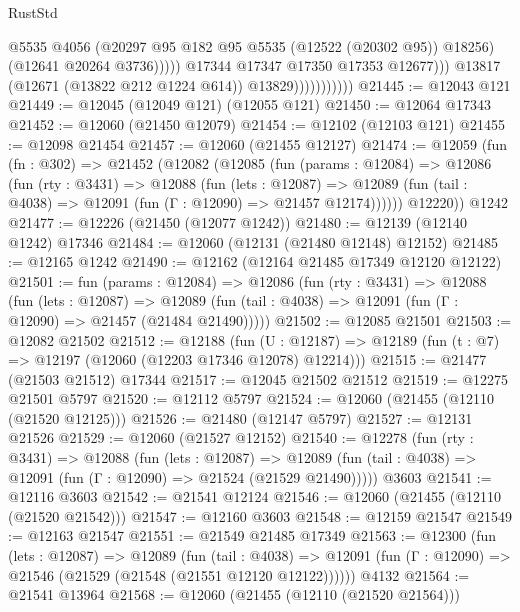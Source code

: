 \begin{lexlean}{RustStd}
\begin{coremodule}
                                        @5535
                                        @4056
                                        (@20297 @95 @182 @95 @5535 (@12522 (@20302 @95)) @18256)
                                        (@12641 @20264 @3736)))))
                                @17344
                                @17347
                                @17350
                                @17353
                                @12677)))
                          @13817
                          (@12671 (@13822 @212 @1224 @614))
                          @13829)))))))))))
@21445 := @12043 @121
@21449 := @12045 (@12049 @121) (@12055 @121)
@21450 := @12064 @17343
@21452 := @12060 (@21450 @12079)
@21454 := @12102 (@12103 @121)
@21455 := @12098 @21454
@21457 := @12060 (@21455 @12127)
@21474 := @12059
    (fun (fn : @302) =>
    @21452
      (@12082
        (@12085
          (fun (params : @12084) =>
          @12086
            (fun (rty : @3431) =>
            @12088
              (fun (lets : @12087) =>
              @12089 (fun (tail : @4038) => @12091 (fun (Γ : @12090) => @21457 @12174))))))
        @12220))
    @1242
@21477 := @12226 (@21450 (@12077 @1242))
@21480 := @12139 (@12140 @1242) @17346
@21484 := @12060 (@12131 (@21480 @12148) @12152)
@21485 := @12165 @1242
@21490 := @12162 (@12164 @21485 @17349 @12120 @12122)
@21501 := fun (params : @12084) =>
  @12086
    (fun (rty : @3431) =>
    @12088
      (fun (lets : @12087) =>
      @12089 (fun (tail : @4038) => @12091 (fun (Γ : @12090) => @21457 (@21484 @21490)))))
@21502 := @12085 @21501
@21503 := @12082 @21502
@21512 := @12188
    (fun (U : @12187) => @12189 (fun (t : @7) => @12197 (@12060 (@12203 @17346 @12078) @12214)))
@21515 := @21477 (@21503 @21512) @17344
@21517 := @12045 @21502 @21512
@21519 := @12275 @21501 @5797
@21520 := @12112 @5797
@21524 := @12060 (@21455 (@12110 (@21520 @12125)))
@21526 := @21480 (@12147 @5797)
@21527 := @12131 @21526
@21529 := @12060 (@21527 @12152)
@21540 := @12278
    (fun (rty : @3431) =>
    @12088
      (fun (lets : @12087) =>
      @12089 (fun (tail : @4038) => @12091 (fun (Γ : @12090) => @21524 (@21529 @21490)))))
    @3603
@21541 := @12116 @3603
@21542 := @21541 @12124
@21546 := @12060 (@21455 (@12110 (@21520 @21542)))
@21547 := @12160 @3603
@21548 := @12159 @21547
@21549 := @12163 @21547
@21551 := @21549 @21485 @17349
@21563 := @12300
    (fun (lets : @12087) =>
    @12089
      (fun (tail : @4038) =>
      @12091 (fun (Γ : @12090) => @21546 (@21529 (@21548 (@21551 @12120 @12122))))))
    @4132
@21564 := @21541 @13964
@21568 := @12060 (@21455 (@12110 (@21520 @21564)))

\end{coremodule}
\end{lexlean}
